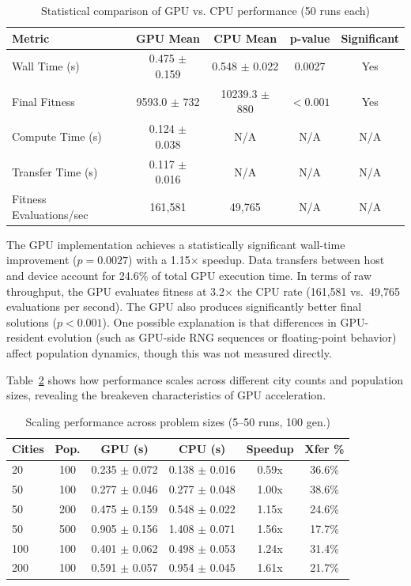 \begin{table}[H]
\centering
\caption{Statistical comparison of GPU vs. CPU performance (50 runs each)}
\label{tab:primary_tsp_results}
\begin{tabular}{@{}lcccc@{}}
\toprule
\textbf{Metric} & \textbf{GPU Mean} & \textbf{CPU Mean} & \textbf{p-value} & \textbf{Significant} \\
\midrule
Wall Time (s) & 0.475 $\pm$ 0.159 & 0.548 $\pm$ 0.022 & 0.0027 & Yes \\
Final Fitness & 9593.0 $\pm$ 732 & 10239.3 $\pm$ 880 & $< 0.001$ & Yes \\
Compute Time (s) & 0.124 $\pm$ 0.038 & N/A & N/A & N/A \\
Transfer Time (s) & 0.117 $\pm$ 0.016 & N/A & N/A & N/A \\
Fitness Evaluations/sec & 161,581 & 49,765 & N/A & N/A \\
\bottomrule
\end{tabular}
\end{table}

The GPU implementation achieves a statistically significant wall-time improvement ($p = 0.0027$) with a 1.15$\times$ speedup. Data transfers between host and device account for 24.6\% of total GPU execution time. In terms of raw throughput, the GPU evaluates fitness at 3.2$\times$ the CPU rate (161,581 vs.\ 49,765 evaluations per second). The GPU also produces significantly better final solutions ($p < 0.001$). One possible explanation is that differences in GPU-resident evolution (such as GPU-side RNG sequences or floating-point behavior) affect population dynamics, though this was not measured directly.


Table~\ref{tab:tsp_scaling_results} shows how performance scales across different city counts and population sizes, revealing the breakeven characteristics of GPU acceleration.

\begin{table}[H]
\centering
\caption{Scaling performance across problem sizes (5--50 runs, 100 gen.)}
\label{tab:tsp_scaling_results}
\small
\begin{tabular}{@{}lccccc@{}}
\toprule
\textbf{Cities} & \textbf{Pop.} & \textbf{GPU (s)} & \textbf{CPU (s)} & \textbf{Speedup} & \textbf{Xfer \%} \\
\midrule
20 & 100 & 0.235 $\pm$ 0.072 & 0.138 $\pm$ 0.016 & 0.59x & 36.6\% \\
50 & 100 & 0.277 $\pm$ 0.046 & 0.277 $\pm$ 0.048 & 1.00x & 38.6\% \\
50 & 200 & 0.475 $\pm$ 0.159 & 0.548 $\pm$ 0.022 & 1.15x & 24.6\% \\
50 & 500 & 0.905 $\pm$ 0.156 & 1.408 $\pm$ 0.071 & 1.56x & 17.7\% \\
100 & 100 & 0.401 $\pm$ 0.062 & 0.498 $\pm$ 0.053 & 1.24x & 31.4\% \\
200 & 100 & 0.591 $\pm$ 0.057 & 0.954 $\pm$ 0.045 & 1.61x & 21.7\% \\
\bottomrule
\end{tabular}
\end{table}


